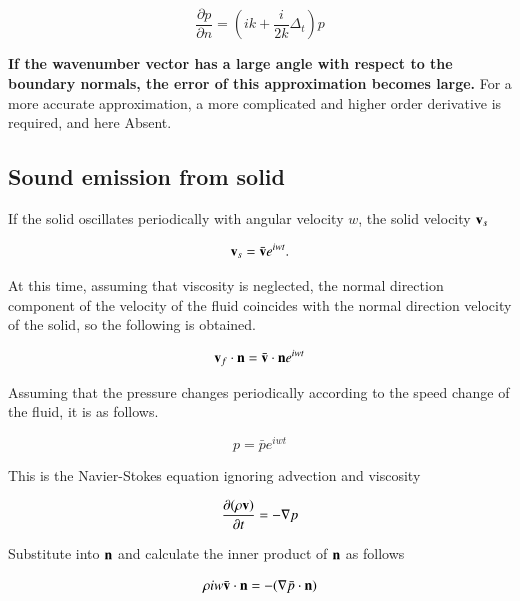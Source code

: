 \begin{tcolorbox}[title=absorption boudnary condition]
\begin{equation}
\frac{\partial p}{\partial n} = \left(ik+\frac{i}{2k}\Delta_t\right)p
\end{equation}
\end{tcolorbox}

{\bf If the wavenumber vector has a large angle with respect to the boundary normals, the error of this approximation becomes large.} For a more accurate approximation, a more complicated and higher order derivative is required, and here Absent.



\subsection{Sound emission from solid}
If the solid oscillates periodically with angular velocity $w$, the solid velocity $\mathbf{v}_s$

\begin{equation}
\mathbf{v}_s = \bar{\mathbf{v}}e^{iwt}.
\end{equation}

At this time, assuming that viscosity is neglected, the normal direction component of the velocity of the fluid coincides with the normal direction velocity of the solid, so the following is obtained.

\begin{equation}
\mathbf{v}_f\cdot\mathbf{n} = \bar{\mathbf{v}}\cdot\mathbf{n}e^{iwt}
\end{equation}

Assuming that the pressure changes periodically according to the speed change of the fluid, it is as follows.

\begin{equation}
 p = \bar{p} e^{iwt}
\end{equation}

This is the Navier-Stokes equation ignoring advection and viscosity

\begin{equation}
\frac{\partial (\rho \mathbf{v})}{\partial t} = -\nabla p
\end{equation}

Substitute into $\mathbf{n}$ and calculate the inner product of $\mathbf{n}$ as follows

\begin{equation}
\rho iw\bar{\mathbf{v}}\cdot\mathbf{n} = - (\nabla \bar{p}\cdot\mathbf{n})
\end{equation}


